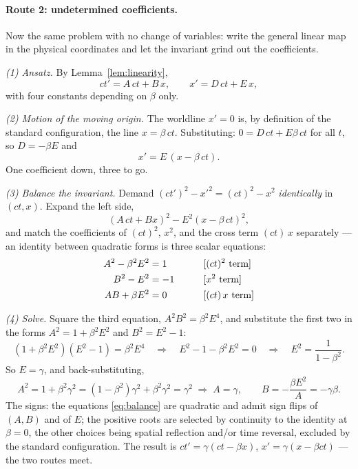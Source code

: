 \documentclass[11pt]{article}
\theoremstyle{plain}
\theoremstyle{definition}
\theoremstyle{remark}
\begin{document}
\paragraph{Route 2: undetermined coefficients.}
Now the same problem with no change of variables: write the general
linear map in the physical coordinates and let the invariant grind out
the coefficients.

\emph{(1) Ansatz.} By Lemma~\ref{lem:linearity},
\begin{equation}
  ct' = A\,ct + B\,x,
  \qquad
  x' = D\,ct + E\,x,
\end{equation}
with four constants depending on $\beta$ only.

\emph{(2) Motion of the moving origin.} The worldline $x' = 0$ is, by
definition of the standard configuration, the line $x = \beta\,ct$.
Substituting: $0 = D\,ct + E\beta\,ct$ for all $t$, so $D = -\beta E$
and
\begin{equation}
  x' = E\,(x - \beta\,ct).
\end{equation}
One coefficient down, three to go.

\emph{(3) Balance the invariant.} Demand
$(ct')^2 - x'^2 = (ct)^2 - x^2$ \emph{identically} in $(ct, x)$. Expand
the left side,
\begin{equation}
  (A\,ct + B x)^2 - E^2(x - \beta\,ct)^2,
\end{equation}
and match the coefficients of $(ct)^2$, $x^2$, and the cross term
$(ct)\,x$ separately --- an identity between quadratic forms is three
scalar equations:
\begin{alignat}{2}
  A^2 - \beta^2 E^2 &= 1
  &\qquad&\text{[$(ct)^2$ term]}
  \notag\\
  B^2 - E^2 &= -1
  &&\text{[$x^2$ term]}
  \label{eq:balance}\\
  AB + \beta E^2 &= 0
  &&\text{[$(ct)\,x$ term]}
  \notag
\end{alignat}

\emph{(4) Solve.} Square the third equation, $A^2 B^2 = \beta^2 E^4$,
and substitute the first two in the forms $A^2 = 1 + \beta^2 E^2$ and
$B^2 = E^2 - 1$:
\begin{equation}
  (1 + \beta^2 E^2)(E^2 - 1) = \beta^2 E^4
  \quad\Longrightarrow\quad
  E^2 - 1 - \beta^2 E^2 = 0
  \quad\Longrightarrow\quad
  E^2 = \frac{1}{1 - \beta^2}.
\end{equation}
So $E = \gamma$, and back-substituting,
\begin{equation}
  A^2 = 1 + \beta^2\gamma^2 = (1 - \beta^2)\gamma^2 + \beta^2\gamma^2
      = \gamma^2
  \;\Rightarrow\; A = \gamma,
  \qquad
  B = -\frac{\beta E^2}{A} = -\gamma\beta .
\end{equation}
The signs: the equations \eqref{eq:balance} are quadratic and admit sign
flips of $(A, B)$ and of $E$; the positive roots are selected by
continuity to the identity at $\beta = 0$, the other choices being
spatial reflection and/or time reversal, excluded by the standard
configuration. The result is $ct' = \gamma(ct - \beta x)$,
$x' = \gamma(x - \beta ct)$ --- the two routes meet.
\end{document}
